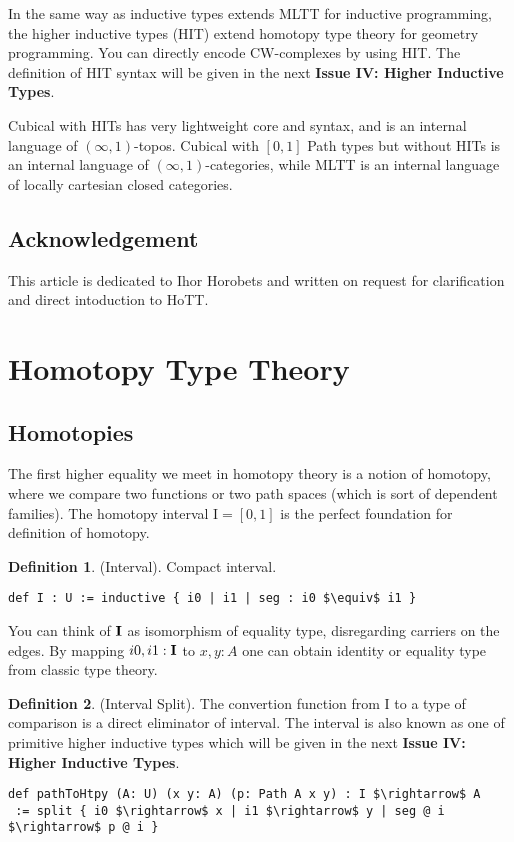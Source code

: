 \documentclass{article}
\theoremstyle{definition}
\newtheorem{definition}{Definition}
\begin{document}
In the same way as inductive types extends MLTT for inductive programming,
the higher inductive types (HIT) extend homotopy type theory for geometry programming.
You can directly encode CW-complexes by using HIT. The definition of HIT syntax will
be given in the next {\bf Issue IV: Higher Inductive Types}.

Cubical with HITs has very lightweight core and syntax, and
is an internal language of $(\infty,1)$-topos.
Cubical with $[0,1]$ Path types but without HITs is an
internal language of $(\infty,1)$-categories, while MLTT
is an internal language of locally cartesian closed categories.

\subsection{Acknowledgement}
This article is dedicated to Ihor Horobets and written on
request for clarification and direct intoduction to HoTT.

\newpage
\section{Homotopy Type Theory}
\subsection{Homotopies}
The first higher equality we meet in homotopy theory is a notion of homotopy,
where we compare two functions or two path spaces (which is sort of dependent families).
The homotopy interval $\mathrm{I}=[0,1]$ is the perfect foundation for definition of homotopy.

\begin{definition} (Interval). Compact interval.
\begin{lstlisting}[mathescape=true]
def I : U := inductive { i0 | i1 | seg : i0 $\equiv$ i1 }
\end{lstlisting}
\end{definition}

You can think of ${\bf I}$ as isomorphism of equality type,
disregarding carriers on the edges. By mapping $i0,i1:{\bf I}$ to $x,y:A$ one can
obtain identity or equality type from classic type theory.

\begin{definition} (Interval Split).
The convertion function from $\mathrm{I}$ to a type of comparison
is a direct eliminator of interval. The interval is also known as one of
primitive higher inductive types which will be given in the next
{\bf Issue IV: Higher Inductive Types}.
\begin{lstlisting}[mathescape=true]
def pathToHtpy (A: U) (x y: A) (p: Path A x y) : I $\rightarrow$ A
 := split { i0 $\rightarrow$ x | i1 $\rightarrow$ y | seg @ i $\rightarrow$ p @ i }
\end{lstlisting}
\end{definition}
\end{document}
